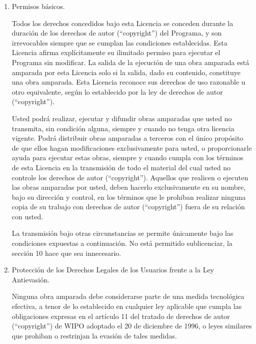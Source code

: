 {\begin{enumerate}
La Fuente Correspondiente es necesario que no incluya nada que los usuarios puedan regenerar autom\'{a}ticamente desde otras partes de la Fuente Correspondiente.

La Fuente Correspondiente de una obra en forma de c\'{o}digo fuente es la obra en s\'{i}.

\item Permisos b\'{a}sicos.

Todos los derechos concedidos bajo esta Licencia se conceden durante la duraci\'{o}n de los derechos de autor (``copyright'') del Programa, y son irrevocables siempre que se cumplan las condiciones establecidas. Esta Licencia afirma expl\'{i}citamente su ilimitado permiso para ejecutar el Programa sin modificar. La salida de la ejecuci\'{o}n de una obra amparada est\'{a} amparada por esta Licencia solo si la salida, dado su contenido, constituye una obra amparada. Esta Licencia reconoce sus derechos de uso razonable u otro equivalente, seg\'{u}n lo establecido por la ley de derechos de autor (``copyright'').

Usted podr\'{a} realizar, ejecutar y difundir obras amparadas que usted no transmita, sin condici\'{o}n alguna, siempre y cuando no tenga otra licencia vigente. Podr\'{a} distribuir obras amparadas a terceros con el \'{u}nico prop\'{o}sito de que ellos hagan modificaciones exclusivamente para usted, o proporcionarle ayuda para ejecutar estas obras, siempre y cuando cumpla con los t\'{e}rminos de esta Licencia en la transmisi\'{o}n de todo el material del cual usted no controle los derechos de autor (``copyright''). Aquellos que realicen o ejecuten las obras amparadas por usted, deben hacerlo exclusivamente en su nombre, bajo su direcci\'{o}n y control, en los t\'{e}rminos que le prohiban realizar ninguna copia de su trabajo con derechos de autor (``copyright'') fuera de su relaci\'{o}n con usted.

La transmisi\'{o}n bajo otras circunstancias se permite \'{u}nicamente bajo las condiciones expuestas a  continuaci\'{o}n. No est\'{a} permitido sublicenciar, la secci\'{o}n 10 hace que sea innecesario.

\item Protecci\'{o}n de los Derechos Legales de los Usuarios frente a la 
Ley Antievasi\'{o}n.

Ninguna obra amparada debe considerarse parte de una medida tecnol\'{o}gica 
efectiva, a tenor de lo establecido en cualquier ley aplicable que cumpla 
las obligaciones expresas en el art\'{i}culo 11 del tratado de derechos de autor (``copyright'') de WIPO 
adoptado el 20 de diciembre de 1996, o leyes similares que prohiban o 
restrinjan la evasi\'{o}n de tales medidas.


\end{enumerate}}

